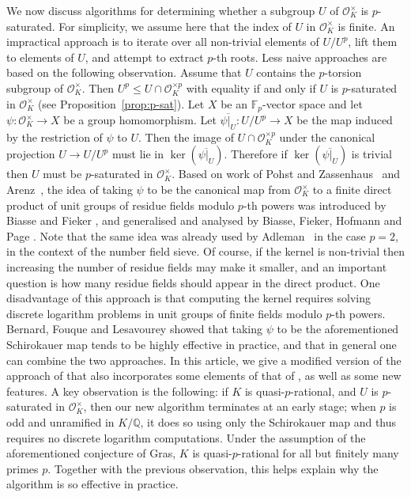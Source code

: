 \documentclass[12pt, a4paper, usenames]{amsart}
\newcommand{\Q}{\mathbb{Q}}
\newcommand{\F}{\mathbb{F}}
\theoremstyle{plain}
\theoremstyle{remark}
\theoremstyle{definition}
\begin{document}
We now discuss algorithms for determining whether a subgroup $U$ of $\mathcal{O}_{K}^{\times}$ is $p$-saturated. For simplicity, we assume here that 
the index of $U$ in $\mathcal{O}_{K}^{\times}$ is finite. 
An impractical approach is to iterate over all non-trivial elements of $U/U^{p}$,
lift them to elements of $U$, and attempt to extract $p$-th roots.
Less naive approaches are based on the following observation.
Assume that $U$ contains the $p$-torsion subgroup of $\mathcal{O}_{K}^{\times}$.
Then $U^{p} \leq U \cap \mathcal{O}_{K}^{\times p}$ with equality if and only 
if $U$ is $p$-saturated in $\mathcal{O}_{K}^{\times}$ (see Proposition~\ref{prop:p-sat}).
Let $X$ be an $\F_{p}$-vector space and let 
$\psi : \mathcal{O}_{K}^{\times} \rightarrow X$ be a group homomorphism. 
Let $\overline{\psi\vert_{U}} : U/U^{p} \rightarrow X$ 
be the map induced by the restriction of $\psi$ to $U$.
Then the image of $U \cap \mathcal{O}_{K}^{\times p}$ under the canonical projection 
$U \rightarrow U/U^{p}$ must lie in $\ker(\overline{\psi\vert_{U}})$.
Therefore if $\ker(\overline{\psi\vert_{U}})$ 
is trivial then $U$ must be $p$-saturated in $\mathcal{O}_{K}^{\times}$.
Based on work of Pohst and Zassenhaus~\cite{MR498486, MR1243639, MR1483321, MR1273458}
and Arenz~\cite{MR1151862},
the idea of taking $\psi$ to be
the canonical map from $\mathcal{O}_{K}^{\times}$ to
a finite direct product of unit groups of residue fields modulo $p$-th powers
was introduced by Biasse and Fieker \cite{MR3207410}, and generalised and analysed by
Biasse, Fieker, Hofmann and Page \cite{MR4440537}. 
Note that the same idea was already used by Adleman~\cite{10.1145/103418.103432} 
in the case $p = 2$, in the context of the number field sieve.
Of course, if the kernel is non-trivial then 
increasing the number of residue fields may make it smaller, and an important 
question is how many residue fields should appear in the direct product.
One disadvantage of this approach is that computing the kernel
requires solving discrete logarithm problems in unit groups
of finite fields modulo $p$-th powers.
Bernard, Fouque and Lesavourey \cite{zbMATH07854947} 
showed that taking $\psi$ to be the aforementioned Schirokauer map
tends to be highly effective in practice, and that in general one can combine the two approaches. In this article, we give a modified version of the approach of 
\cite{zbMATH07854947} that also incorporates some elements of that of \cite{MR4440537},
as well as some new features. 
A key observation is the following: if $K$ is quasi-$p$-rational,
and $U$ is $p$-saturated in $\mathcal{O}_{K}^{\times}$,
then our new algorithm terminates at an early stage; when 
$p$ is odd and unramified in $K/\Q$,
it does so using only the Schirokauer map and thus requires no discrete logarithm computations.
Under the assumption of the aforementioned conjecture of Gras, 
$K$ is quasi-$p$-rational for all but finitely many primes $p$.
Together with the previous observation, 
this helps explain why the algorithm is so effective in practice. 
\end{document}
